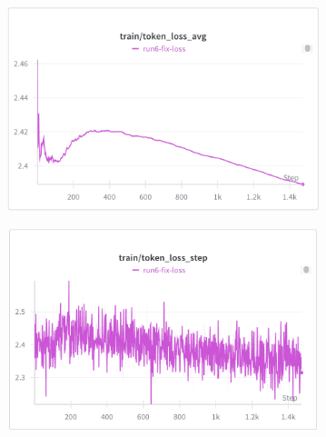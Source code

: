 \documentclass[11pt,a4paper]{article}
\begin{document}
\begin{figure}[h!]
    \centering
    \begin{subfigure}[b]{0.48\textwidth}
        \centering
        \includegraphics[width=\textwidth]{train_loss.png}
        \label{fig:train_loss}
    \end{subfigure}
    \hfill
    \begin{subfigure}[b]{0.48\textwidth}
        \centering
        \includegraphics[width=\textwidth]{train_loss_step.png}
        \label{fig:train_loss_step}
    \end{subfigure}
    
    \vspace{0.5em}
    

\end{figure}
\end{document}

